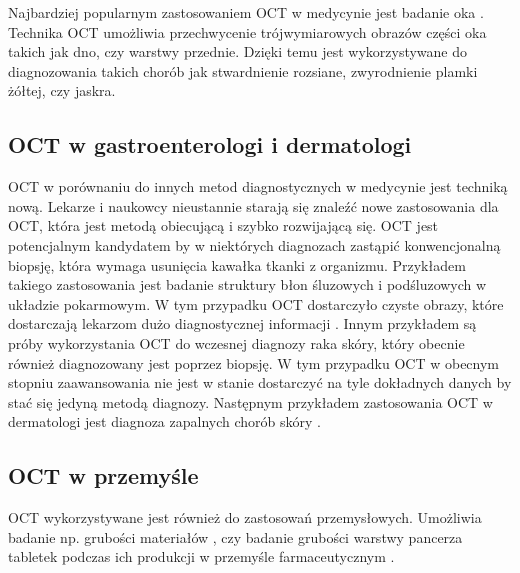 Najbardziej popularnym zastosowaniem OCT w medycynie jest badanie oka \cite{Fercher03}. Technika OCT umożliwia przechwycenie trójwymiarowych obrazów części oka takich jak dno, czy warstwy przednie. Dzięki temu jest wykorzystywane do diagnozowania takich chorób jak stwardnienie rozsiane, zwyrodnienie plamki żółtej, czy jaskra. 

\subsection{OCT w gastroenterologi i dermatologi}

OCT w porównaniu do innych metod diagnostycznych w medycynie jest techniką nową. Lekarze i naukowcy nieustannie starają się znaleźć nowe zastosowania dla OCT, która jest metodą obiecującą i szybko rozwijającą się. OCT jest potencjalnym kandydatem by w niektórych diagnozach zastąpić konwencjonalną biopsję, która wymaga usunięcia kawałka tkanki z organizmu. Przykładem takiego zastosowania jest badanie struktury błon śluzowych i podśluzowych w układzie pokarmowym. W tym przypadku OCT dostarczyło czyste obrazy, które dostarczają lekarzom dużo diagnostycznej informacji \cite{Rollins:99}. Innym przykładem są próby wykorzystania OCT do wczesnej diagnozy raka skóry, który obecnie również diagnozowany jest poprzez biopsję. W tym przypadku OCT w obecnym stopniu zaawansowania nie jest w stanie dostarczyć na tyle dokładnych danych by stać się jedyną metodą diagnozy. Następnym przykładem zastosowania OCT w dermatologi jest diagnoza zapalnych chorób skóry \cite{Welzel01}.

\subsection{OCT w przemyśle}

OCT wykorzystywane jest również do zastosowań przemysłowych. Umożliwia badanie np. grubości materiałów \cite{walecki2006determining}, czy badanie grubości warstwy pancerza tabletek podczas ich produkcji w przemyśle farmaceutycznym \cite{markl2014device}.
















